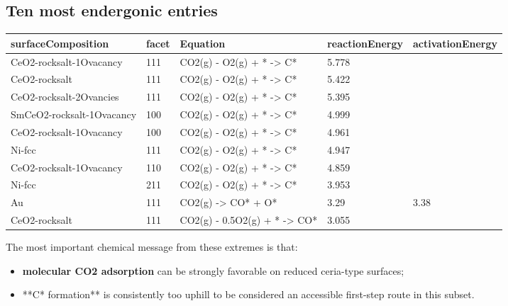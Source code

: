 \documentclass[11pt]{article}
\begin{document}
\subsection{Ten most endergonic entries}
\begin{center}
\small
\begin{tabular}{| p{} | p{} | p{} | p{} | p{} |}
\hline
surfaceComposition & facet & Equation & reactionEnergy & activationEnergy \\
\hline
CeO2-rocksalt-1Ovacancy & 111 & CO2(g) - O2(g) + * -> C* & 5.778 &  \\
\hline
CeO2-rocksalt & 111 & CO2(g) - O2(g) + * -> C* & 5.422 &  \\
\hline
CeO2-rocksalt-2Ovancies & 111 & CO2(g) - O2(g) + * -> C* & 5.395 &  \\
\hline
SmCeO2-rocksalt-1Ovacancy & 100 & CO2(g) - O2(g) + * -> C* & 4.999 &  \\
\hline
CeO2-rocksalt-1Ovacancy & 100 & CO2(g) - O2(g) + * -> C* & 4.961 &  \\
\hline
Ni-fcc & 111 & CO2(g) - O2(g) + * -> C* & 4.947 &  \\
\hline
CeO2-rocksalt-1Ovacancy & 110 & CO2(g) - O2(g) + * -> C* & 4.859 &  \\
\hline
Ni-fcc & 211 & CO2(g) - O2(g) + * -> C* & 3.953 &  \\
\hline
Au & 111 & CO2(g) -> CO* + O* & 3.29 & 3.38 \\
\hline
CeO2-rocksalt & 111 & CO2(g) - 0.5O2(g) + * -> CO* & 3.055 &  \\
\hline
\end{tabular}
\normalsize
\end{center}
The most important chemical message from these extremes is that:
\begin{itemize}
\item \textbf{molecular CO2 adsorption} can be strongly favorable on reduced ceria-type surfaces;
\item **C* formation** is consistently too uphill to be considered an accessible first-step route in this subset.
\end{itemize}
\end{document}
